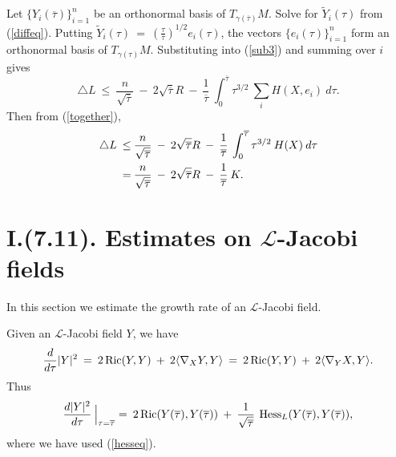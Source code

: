 Let $\{Y_i(\overline{\tau})\}_{i=1}^n$ be an orthonormal basis of
$T_{\gamma(\overline{\tau})}M$.
Solve for $\widetilde{Y}_i(\tau)$ from (\ref{diffeq}).
Putting
$\widetilde{Y}_i(\tau)
\: = \: \left( \frac{\tau}{\overline{\tau}} \right)^{1/2}
e_i(\tau)$,
the vectors $\{e_i(\tau)\}_{i=1}^n$ form an orthonormal basis of
$T_{\gamma(\tau)}M$.
Substituting into
(\ref{sub3}) and summing over $i$ gives
\begin{equation}
\triangle L \: \le \:
\frac{n}{\sqrt{\overline{\tau}}} \: - \: 2 \sqrt{\overline{\tau}} R
\: - \: \frac{1}{\overline{\tau}} \: \int_0^{\overline{\tau}}
\tau^{3/2} \: \sum_i H(X, e_i) \: d\tau.
\end{equation}
Then from (\ref{together}),
\begin{align} \label{touse2}
\triangle L \: \le \: &
\frac{n}{\sqrt{\overline{\tau}}} \: - \: 2 \sqrt{\overline{\tau}} R
\: - \: \frac{1}{\overline{\tau}} \: \int_0^{\overline{\tau}}
\tau^{3/2} \: H(X) \: d\tau \\
= \: & \frac{n}{\sqrt{\overline{\tau}}} \: - \: 2 \sqrt{\overline{\tau}} R
\: - \: \frac{1}{\overline{\tau}} \: K. \notag
\end{align}

\section{I.(7.11). Estimates on ${\mathcal L}$-Jacobi fields}

In this section we estimate the growth rate of an ${\mathcal L}$-Jacobi field.

Given an ${\mathcal L}$-Jacobi field $Y$, we have
\begin{equation}
\frac{d}{d\tau} |Y|^2 \: =\: 2 \operatorname{Ric}(Y, Y) \: + \: 2 \langle \nabla_X Y, Y
\rangle \: = \: 2 \operatorname{Ric}(Y, Y) \: + \: 2 \langle \nabla_Y X, Y \rangle.
\end{equation}
Thus
\begin{equation}
\frac{d |Y|^2}{d\tau} \: \Big|_{\tau = \overline{\tau}}
= \: 2 \operatorname{Ric}(Y(\overline{\tau}), Y(\overline{\tau}))
\: + \: \frac{1}{\sqrt{\overline{\tau}}} \:
\operatorname{Hess}_L(Y(\overline{\tau}), Y(\overline{\tau})),
\end{equation}
where we have used (\ref{hesseq}).

